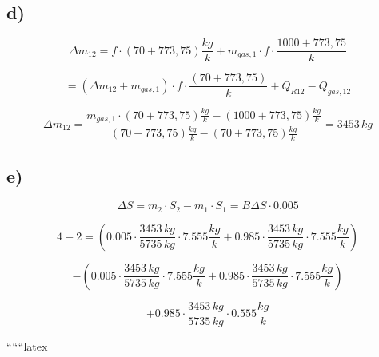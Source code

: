 \subsection*{d)}

\[
\Delta m_{12} = f \cdot (70 + 773,75) \frac{kg}{k} + m_{gas,1} \cdot f \cdot \frac{1000 + 773,75}{k}
\]

\[
= (\Delta m_{12} + m_{gas,1}) \cdot f \cdot \frac{(70 + 773,75)}{k} + Q_{R12} - Q_{gas,12}
\]

\[
\Delta m_{12} = \frac{m_{gas,1} \cdot (70 + 773,75) \frac{kg}{k} - (1000 + 773,75) \frac{kg}{k}}{(70 + 773,75) \frac{kg}{k} - (70 + 773,75) \frac{kg}{k}} = \boxed{3453 \, kg}
\]

\subsection*{e)}

\[
\Delta S = m_2 \cdot S_2 - m_1 \cdot S_1 = B \Delta S \cdot \boxed{0.005}
\]

\[
4-2 = (0.005 \cdot \frac{3453 \, kg}{5735 \, kg} \cdot 7.555 \frac{kg}{k} + 0.985 \cdot \frac{3453 \, kg}{5735 \, kg} \cdot 7.555 \frac{kg}{k})
\]

\[
- (0.005 \cdot \frac{3453 \, kg}{5735 \, kg} \cdot 7.555 \frac{kg}{k} + 0.985 \cdot \frac{3453 \, kg}{5735 \, kg} \cdot 7.555 \frac{kg}{k})
\]

\[
+ 0.985 \cdot \frac{3453 \, kg}{5735 \, kg} \cdot 0.555 \frac{kg}{k}
\]

``````latex


